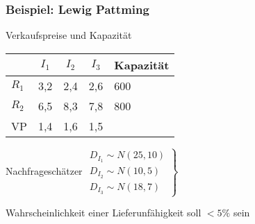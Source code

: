 \begin{frame}
 \frametitle{Beispiel: Lewig Pattming}
 \begin{block}{Verkaufspreise und Kapazität}
  \begin{center}\upshape
    \begin{tabular}{lccc@{\qquad}l}
    \toprule
      & $I_1$ & $I_2$ & $I_3$ & Kapazität\\
    \midrule 
      $R_1$ & 3,2 & 2,4 & 2,6 & 600 \\
      $R_2$ & 6,5 & 8,3 & 7,8 & 800 \\
    \midrule
      VP & 1,4 & 1,6 & 1,5 & \\
    \bottomrule
    \end{tabular}
  \end{center}
 \end{block}
 \begin{block}{Nachfrageschätzer}
  $\left.\begin{array}{l}
   D_{I_1} \sim N(25, 10)\\
   D_{I_2} \sim N(10, 5)\\
   D_{I_3} \sim N(18, 7)
  \end{array}\right\}$
  \begin{minipage}[m]{.6\linewidth}
   \raggedright
   Wahrscheinlichkeit einer Lieferunfähigkeit soll $<5\%$ sein
  \end{minipage}
 \end{block}
\end{frame}

